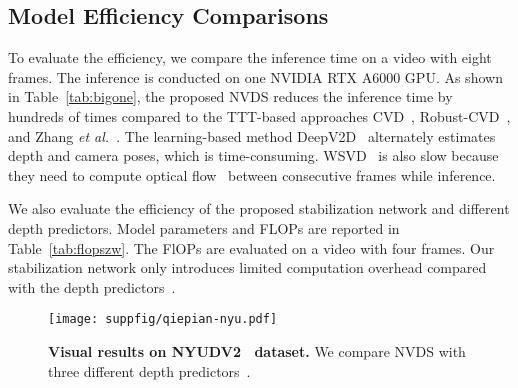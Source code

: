 \documentclass[10pt,twocolumn,letterpaper]{article}
\def\sx{NVDS}
\def\reftab{Table}
\begin{document}
\begin{table}[!t]
\addtolength{\tabcolsep}{-4pt}
\begin{center}
\end{center}
\vspace{-12pt}
\caption{\textbf{Comparisons of FlOPs and model parameters.} We evaluate the efficiency of our stabilization network and different depth predictors~\cite{midas,dpt,newcrfs}. The FlOPs are evaluated on a  video with four frames.}\label{tab:flopszw}
\end{table}

\subsection{Model Efficiency Comparisons}
\label{sec:spd}
To evaluate the efficiency, we compare the inference time on a  video with eight frames. The inference is conducted on one NVIDIA RTX A6000 GPU. As shown in \reftab{}~\ref{tab:bigone}, the proposed \sx{} reduces the inference time by hundreds of times compared to the TTT-based approaches CVD~\cite{CVD}, Robust-CVD~\cite{rcvd}, and Zhang \textit{et al.}~\cite{dycvd}. The learning-based method DeepV2D~\cite{deepv2d} alternately estimates depth and camera poses, which is time-consuming. WSVD~\cite{wsvd} is also slow because they need to compute optical flow~\cite{flownet2} between consecutive frames while inference. 

We also evaluate the efficiency of the proposed stabilization network and different depth predictors. Model parameters and FLOPs are reported in \reftab{}~\ref{tab:flopszw}. The FlOPs are evaluated on a  video with four frames. Our stabilization network only introduces limited computation overhead compared with the depth predictors~\cite{midas,dpt,newcrfs}.


\begin{figure*}[!t]
\begin{center}
   \texttt{[image: suppfig/qiepian-nyu.pdf]}
\end{center}
\vspace{-12pt}
   \caption{\textbf{Visual results on NYUDV2~\cite{nyu} dataset.} We compare NVDS with three different depth predictors~\cite{midas,dpt,newcrfs}.}
\label{fig:nyudp}
\end{figure*}
\end{document}

